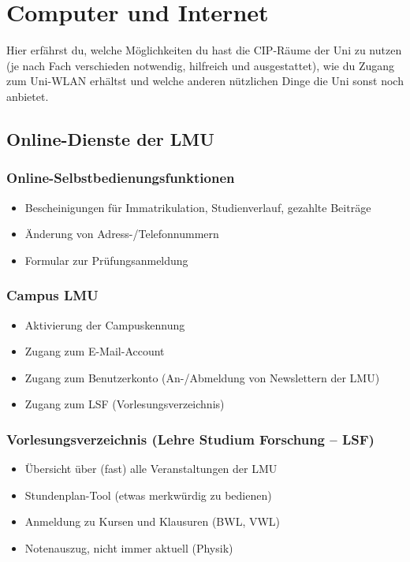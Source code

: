 ﻿\chapter{Computer und Internet}

Hier erfährst du, welche Möglichkeiten du hast die CIP-Räume der Uni zu nutzen (je nach
Fach verschieden notwendig, hilfreich und ausgestattet), wie du Zugang zum Uni-WLAN erhältst 
und welche anderen nützlichen Dinge die Uni sonst noch anbietet.

\section{Online-Dienste der LMU}
\subsection*{Online-Selbstbedienungsfunktionen}
\begin{itemize}
	\item Bescheinigungen für Immatrikulation, Studienverlauf, gezahlte Beiträge
	\item Änderung von Adress-/Telefonnummern
	\item Formular zur Prüfungsanmeldung
\end{itemize}
\begin{urlList}
\end{urlList}

\subsection*{Campus LMU}
\begin{itemize}
	\item Aktivierung der Campuskennung
	\item Zugang zum E-Mail-Account
	\item Zugang zum Benutzerkonto (An-/Abmeldung von Newslettern der LMU)
	\item Zugang zum LSF (Vorlesungsverzeichnis)
\end{itemize}
\begin{urlList}
\end{urlList}

\subsection*{Vorlesungsverzeichnis (Lehre Studium Forschung -- LSF)}
\begin{itemize}
	\item Übersicht über (fast) alle Veranstaltungen der LMU
	\item Stundenplan-Tool (etwas merkwürdig zu bedienen)
	\item Anmeldung zu Kursen und Klausuren (BWL, VWL)
        \item Notenauszug, nicht immer aktuell (Physik)
\end{itemize}
\begin{urlList}
\end{urlList}

